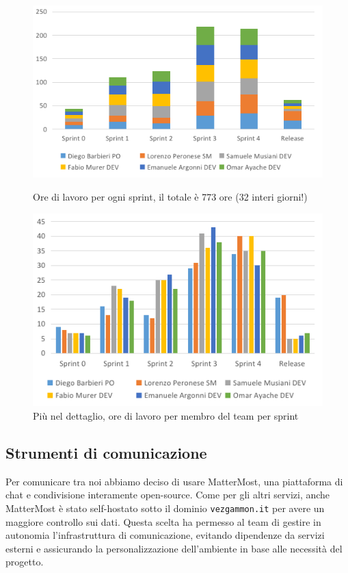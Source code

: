 \documentclass{article}
\begin{document}
\begin{figure}[H]
    \centering
    \begin{minipage}[t]{0.52\textwidth}
        \centering
        \includegraphics[width=\textwidth]{report-logging_sprints}
        \caption{Ore di lavoro per ogni sprint, il totale è 773 ore (32 interi giorni!)}
        \label{fig:logging-sprints}
    \end{minipage}
    \hfill
    \begin{minipage}[t]{0.47\textwidth}
        \centering
        \includegraphics[width=\textwidth]{report-logging_full}
        \caption{Più nel dettaglio, ore di lavoro per membro del team per sprint}
        \label{fig:logging-full}
    \end{minipage}    
\end{figure}



\subsection{Strumenti di comunicazione} \label{sec:mm}
Per comunicare tra noi abbiamo deciso di usare MatterMost, una piattaforma di chat e condivisione interamente open-source. Come per gli altri 
servizi, anche MatterMost è stato self-hostato sotto il dominio \texttt{vezgammon.it} per avere un maggiore controllo sui dati. Questa scelta ha permesso 
al team di gestire in autonomia l'infrastruttura di comunicazione, evitando dipendenze da servizi esterni e assicurando la personalizzazione 
dell'ambiente in base alle necessità del progetto.
\end{document}
